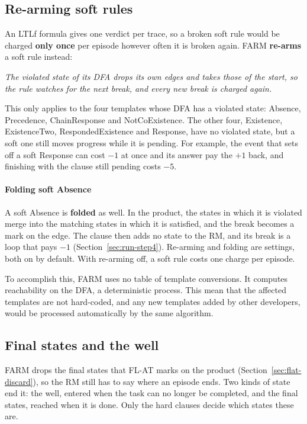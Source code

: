 \documentclass[11pt,english,listoffigures,listoftables]{tfgetsinf}
\newcommand{\keyidea}[1]{\par\smallskip\noindent\hspace*{0.6em}{\color{gray!55}\vrule width 1.5pt}\hspace{8pt}\parbox[t]{\dimexpr\linewidth-0.6em-9.5pt\relax}{\itshape #1}\par\smallskip}  %
\begin{document}
\subsection{Re-arming soft rules}
\label{sec:recurrent}
An LTLf formula gives one verdict per trace, so a broken soft rule would be charged \textbf{only once} per episode however often it is broken again. FARM \textbf{re-arms} a soft rule instead: 

\keyidea{The violated state of its DFA drops its own edges and takes those of the start, so the rule watches for the next break, and every new break is charged again.} 

This only applies to the four templates whose DFA has a violated state: Absence, Precedence, ChainResponse and NotCoExistence. The other four, Existence, ExistenceTwo, RespondedExistence and Response, have no violated state, but a soft one still moves progress while it is pending. For example, the event that sets off a soft Response can cost $-1$ at once and its answer pay the $+1$ back, and finishing with the clause still pending costs $-5$.

\paragraph{Folding soft Absence} A soft Absence is \textbf{folded} as well. In the product, the states in which it is violated merge into the matching states in which it is satisfied, and the break becomes a mark on the edge. The clause then adds no state to the RM, and its break is a loop that pays $-1$ (Section~\ref{sec:run-step4}). Re-arming and folding are settings, both on by default. With re-arming off, a soft rule costs one charge per episode.

To accomplish this, FARM uses no table of template conversions. It computes reachability on the DFA, a deterministic process. This mean that the affected templates are not hard-coded, and any new templates added by other developers, would be processed automatically by the same algorithm.

\subsection{Final states and the well}
\label{sec:final-well}
FARM drops the final states that FL-AT marks on the product (Section~\ref{sec:flat-discard}), so the RM still has to say where an episode ends. Two kinds of state end it: the well, entered when the task can no longer be completed, and the final states, reached when it is done. Only the hard clauses decide which states these are.
\end{document}
